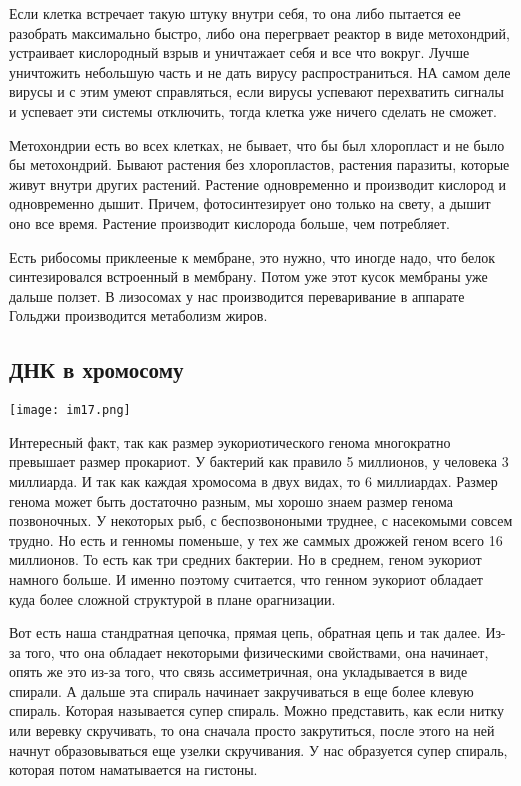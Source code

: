 Если клетка встречает такую штуку внутри себя, то она 
либо пытается ее разобрать максимально быстро, либо она перегрвает 
реактор в виде метохондрий, устраивает кислородный взрыв и уничтажает себя и 
все что вокруг. Лучше уничтожить небольшую часть и не дать вирусу распространиться. 
НА самом деле вирусы и с этим умеют справляться, если 
вирусы успевают перехватить сигналы и успевает эти системы отключить, 
тогда клетка уже ничего сделать не сможет. 

Метохондрии есть во всех клетках, не бывает, что бы 
был хлоропласт и не было бы метохондрий. Бывают растения без хлоропластов, 
растения паразиты, которые живут внутри других растений. Растение одновременно и 
производит кислород и одновременно дышит. Причем, фотосинтезирует оно только на 
свету, а дышит оно все время. Растение производит кислорода больше, чем потребляет. 

Есть рибосомы приклееные к мембране, это нужно, что иногде надо, 
что белок синтезировался встроенный в мембрану. Потом уже этот 
кусок мембраны уже дальше ползет. В лизосомах 
у нас производится переваривание в аппарате Гольджи производится 
метаболизм жиров. 
  
\subsection{ДНК в хромосому}
\texttt{[image: im17.png]}

Интересный факт, так как размер эукориотического генома многократно 
превышает размер прокариот. У бактерий как правило 5 миллионов, у человека
3 миллиарда. И так как каждая хромосома в двух видах, то 
6 миллиардах. Размер генома может 
быть достаточно разным, мы хорошо знаем размер генома позвоночных. 
У некоторых рыб, с беспозвоноными труднее, с насекомыми совсем трудно. 
Но есть и генномы поменьше, у тех же саммых дрожжей геном всего 
16 миллионов. То есть как три средних бактерии. Но в среднем, 
геном эукориот намного больше. И именно поэтому считается, 
что генном эукориот обладает куда более сложной структурой в плане орагнизации. 

Вот есть наша стандратная цепочка, прямая цепь, обратная цепь и так далее. Из-за
того, что она обладает некоторыми физическими свойствами, она начинает, опять же 
это из-за того, что связь ассиметричная, она укладывается в виде спирали. 
А дальше эта спираль начинает закручиваться в еще более клевую спираль. Которая 
называется супер спираль. Можно представить, как если нитку или веревку скручивать, 
то она сначала просто закрутиться, после этого на ней начнут образовываться 
еще узелки скручивания. У нас образуется супер спираль, 
которая потом наматывается на гистоны. 

